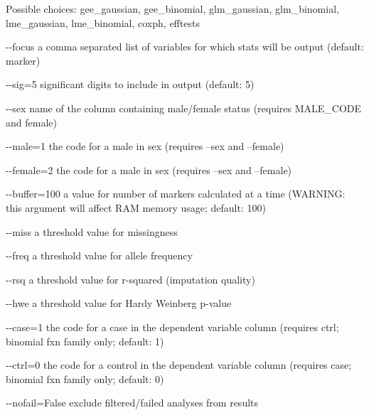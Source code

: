 \documentclass[letterpaper,10pt,english]{sphinxmanual}
\begin{document}
\begin{description}
\begin{optionlist}{3cm}
Possible choices: gee\_gaussian, gee\_binomial, glm\_gaussian, glm\_binomial, lme\_gaussian, lme\_binomial, coxph, efftests
\item [-{-}focus]  
a comma separated list of variables for which stats will be output (default: marker)
\item [-{-}sig=5]  
significant digits to include in output (default: 5)
\item [-{-}sex]  
name of the column containing male/female status (requires MALE\_CODE and female)
\item [-{-}male=1]  
the code for a male in sex (requires --sex and --female)
\item [-{-}female=2]  
the code for a male in sex (requires --sex and --female)
\item [-{-}buffer=100]  
a value for number of markers calculated at a time (WARNING: this argument will affect RAM memory usage; default: 100)
\item [-{-}miss]  
a threshold value for missingness
\item [-{-}freq]  
a threshold value for allele frequency
\item [-{-}rsq]  
a threshold value for r-squared (imputation quality)
\item [-{-}hwe]  
a threshold value for Hardy Weinberg p-value
\item [-{-}case=1]  
the code for a case in the dependent variable column (requires ctrl; binomial fxn family only; default: 1)
\item [-{-}ctrl=0]  
the code for a control in the dependent variable column (requires case; binomial fxn family only; default: 0)
\item [-{-}nofail=False]  
exclude filtered/failed analyses from results
\end{optionlist}

\end{description}
\end{document}
